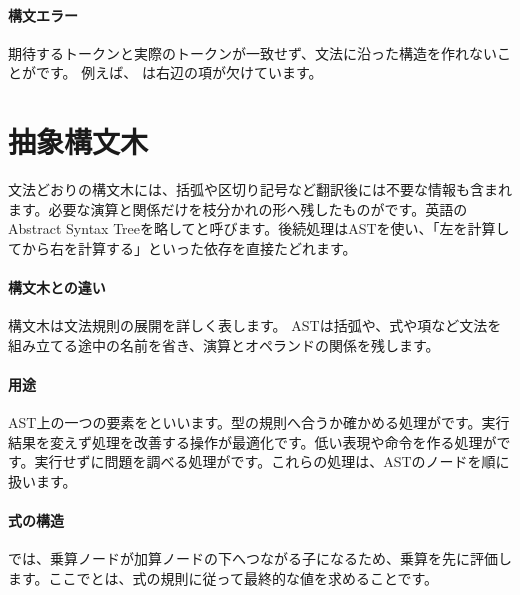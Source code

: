 \paragraph{構文エラー}
        期待するトークンと実際のトークンが一致せず、文法に沿った構造を作れないことがです。
        例えば、 は右辺の項が欠けています。

\par
\endgroup
\par
\endgroup


\section{抽象構文木}
\label{sec:02-language-08}

文法どおりの構文木には、括弧や区切り記号など翻訳後には不要な情報も含まれます。必要な演算と関係だけを枝分かれの形へ残したものがです。英語のAbstract Syntax Treeを略してと呼びます。後続処理はASTを使い、「左を計算してから右を計算する」といった依存を直接たどれます。

\begingroup
\begingroup
\paragraph{構文木との違い}
        構文木は文法規則の展開を詳しく表します。
        ASTは括弧や、式や項など文法を組み立てる途中の名前を省き、演算とオペランドの関係を残します。

\paragraph{用途}
        AST上の一つの要素をといいます。型の規則へ合うか確かめる処理がです。実行結果を変えず処理を改善する操作が最適化です。低い表現や命令を作る処理がです。実行せずに問題を調べる処理がです。これらの処理は、ASTのノードを順に扱います。

\par
\endgroup
\medskip
\begingroup
      \centering
      \vspace{4mm}
\paragraph{式の構造}
         では、乗算ノードが加算ノードの下へつながる子になるため、乗算を先に評価します。ここでとは、式の規則に従って最終的な値を求めることです。

